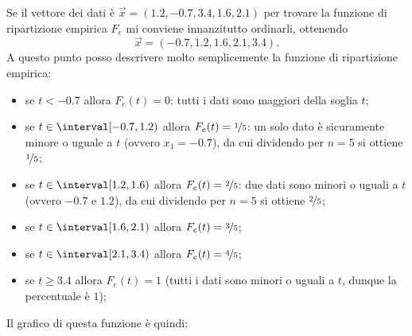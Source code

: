 \begin{example}
    Se il vettore dei dati è $\vec x = (1.2, -0.7, 3.4, 1.6, 2.1)$ per trovare la funzione di ripartizione empirica $F_e$ mi conviene innanzitutto ordinarli, ottenendo \[
        \vec x = (-0.7, 1.2, 1.6, 2.1, 3.4).    
    \] A questo punto posso descrivere molto semplicemente la funzione di ripartizione empirica:
    \begin{itemize}
        \item se $t < -0.7$ allora $F_e(t) = 0$: tutti i dati sono maggiori della soglia $t$;
        \item se $t \in \interval[{-0.7, 1.2})$ allora $F_e(t) = \nicefrac{1}{5}$: un solo dato è sicuramente minore o uguale a $t$ (ovvero $x_1 = -0.7$), da cui dividendo per $n = 5$ si ottiene $\nicefrac{1}{5}$;
        \item se $t \in \interval[{1.2, 1.6})$ allora $F_e(t) = \nicefrac{2}{5}$: due dati sono minori o uguali a $t$ (ovvero $-0.7$ e $1.2$), da cui dividendo per $n = 5$ si ottiene $\nicefrac{2}{5}$;
        \item se $t \in \interval[{1.6, 2.1})$ allora $F_e(t) = \nicefrac{3}{5}$;
        \item se $t \in \interval[{2.1, 3.4})$ allora $F_e(t) = \nicefrac{4}{5}$;
        \item se $t \geq 3.4$ allora $F_e(t) = 1$ (tutti i dati sono minori o uguali a $t$, dunque la percentuale è $1$);
    \end{itemize}

    Il grafico di questa funzione è quindi:
    \begin{center}
    \end{center}
\end{example}

